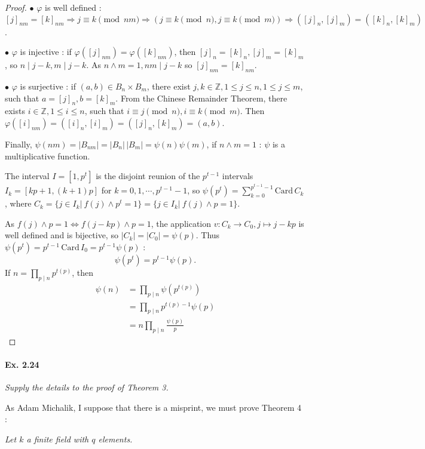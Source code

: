 \documentclass[11pt,a4paper]{article}
\newcommand{\Z}{\mathbb{Z}}
\begin{document}
{\begin{proof}
$\bullet$ $\varphi$ is well defined : $[j]_{nm} = [k]_{nm} \Rightarrow j\equiv k \pmod {nm} \Rightarrow (j\equiv k \pmod {n}, j\equiv k \pmod {m}) \Rightarrow ([j]_n,[j]_m) =( [k]_n,[k]_m)$.

$\bullet$ $\varphi$ is injective : if $\varphi([j]_{nm}) = \varphi([k]_{nm})$, then $[j]_n = [k]_n, [j]_m=[k]_m$, so $n\mid j-k, m\mid j-k$. As $n\wedge m = 1, nm \mid j-k$ so $[j]_{nm} = [k]_{nm}$.

$\bullet$ $\varphi$ is surjective : if $ (a,b) \in B_n\times B_m$, there exist $ j,k \in \Z, 1\leq j \leq n, 1 \leq j \leq m$, such that $a = [j]_n, b = [k]_m$. From the Chinese Remainder Theorem, there exists $i \in \Z, 1\leq i \leq n$, such that $i \equiv j \pmod n, i \equiv k \pmod m$. Then $\varphi([i]_{nm}) = ([i]_n,[i]_m) = ( [j]_n, [k]_m) = (a,b)$.

Finally, $\psi(nm) = \vert B_{nm} \vert = \vert B_n \vert\,  \vert B_m \vert = \psi(n) \psi(m)$, if $n \wedge m =1$ : $\psi$ is a multiplicative function.

The interval $I = [1,p^t]$ is the disjoint reunion of the $p^{t-1}$ intervals $I_k = [kp+1, (k+1)p]$ for $k = 0,1,\cdots, p^{t-1} - 1$, so $\psi(p^t) = \sum\limits_{k=0}^{p^{t-1}-1} \mathrm{Card}\,C_k$, where $C_k =  \{j \in I_k \vert \  f(j) \wedge p^t = 1\} =  \{j \in I_k \vert \  f(j) \wedge p= 1\}$.

As $ f(j) \wedge p = 1 \iff f(j - kp) \wedge p = 1$, the application $v : C_k \to C_0, j \mapsto j -kp$ is well defined and is bijective, so $\vert C_k \vert = \vert C_0 \vert = \psi(p)$. Thus $\psi(p^t) = p^{t-1}\, \mathrm{Card}\, I_0 = p^{t-1} \psi(p)$ :
$$\psi(p^t) = p^{t-1} \psi(p).$$
If $n = \prod_{p \mid n}  p^{t(p)}$, then 
\begin{align*}
\psi(n) &= \prod_{p \mid n} \psi(p^{t(p)})\\
&=  \prod_{p \mid n} p^{t(p)-1} \psi(p)\\
&= n \prod_{p \mid n} \frac{\psi(p)}{p}
\end{align*}
\end{proof}

\paragraph{Ex. 2.24}

{\it Supply the details to the proof of Theorem 3.
}

As Adam Michalik, I suppose that there is a misprint, we must prove Theorem 4 :

{\it Let $k$ a finite field with $q$ elements.

}}
\end{document}
